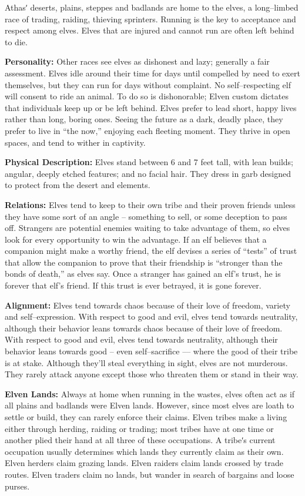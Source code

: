 \documentclass[10pt,a4paper,twocolumn]{d20}
\begin{document}
Athasʹ deserts, plains, steppes and badlands are home to the elves, a long–limbed race of trading, raiding, thieving sprinters. Running is the key to acceptance and respect among elves. Elves that are injured and cannot run are often left behind to die.

\textbf{Personality:} Other races see elves as dishonest and lazy; generally a fair assessment. Elves idle around their time for days until compelled by need to exert themselves, but they can run for days without complaint. No self–respecting elf will consent to ride an animal. To do so is dishonorable; Elven custom dictates that individuals keep up or be left behind. Elves prefer to lead short, happy lives rather than long, boring ones. Seeing the future as a dark, deadly place, they prefer to live in ``the now,'' enjoying each fleeting moment. They thrive in open spaces, and tend to wither in captivity.

\textbf{Physical Description:} Elves stand between 6 and 7 feet tall, with lean builds; angular, deeply etched features; and no facial hair. They dress in garb designed to protect from the desert and elements.

\textbf{Relations:} Elves tend to keep to their own tribe and their proven friends unless they have some sort of an angle – something to sell, or some deception to pass off. Strangers are potential enemies waiting to take advantage of them, so elves look for every opportunity to win the advantage. If an elf believes that a companion might make a worthy friend, the elf devises a series of ``tests'' of trust that allow the companion to prove that their friendship is ``stronger than the bonds of death,'' as elves say. Once a stranger has gained an elf’s trust, he is forever that elf’s friend. If this trust is ever betrayed, it is gone forever.

\textbf{Alignment:} Elves tend towards chaos because of their love of freedom, variety and self–expression. With respect to good and evil, elves tend towards neutrality, although their behavior leans towards chaos because of their love of freedom. With respect to good and evil, elves tend towards neutrality, although their behavior leans towards good – even self–sacrifice –– where the good of their tribe is at stake. Although they’ll steal everything in sight, elves are not murderous. They rarely attack anyone except those who threaten them or stand in their way.

\textbf{Elven Lands:} Always at home when running in the wastes, elves often act as if all plains and badlands were Elven lands. However, since most elves are loath to settle or build, they can rarely enforce their claims. Elven tribes make a living either through herding, raiding or trading; most tribes have at one time or another plied their hand at all three of these occupations. A tribeʹs current occupation usually determines which lands they currently claim as their own. Elven herders claim grazing lands. Elven raiders claim lands crossed by trade routes. Elven traders claim no lands, but wander in search of bargains and loose purses.
\end{document}

